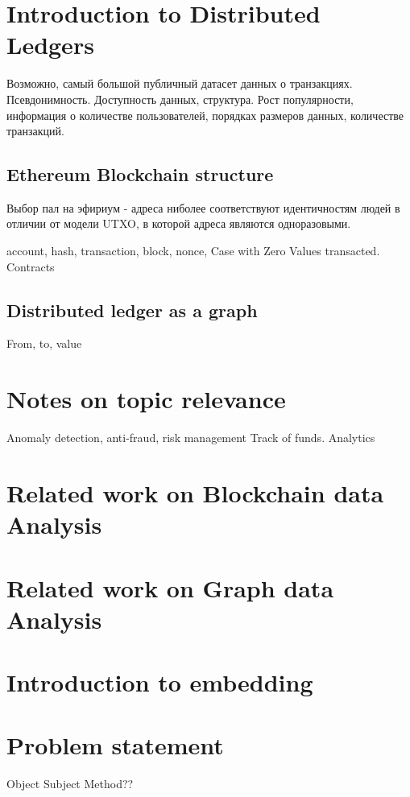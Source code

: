 \Introduction

\section{Introduction to Distributed Ledgers}
Возможно, самый большой публичный датасет данных о транзакциях. Псевдонимность. Доступность данных, структура.
Рост популярности, информация о количестве пользователей, порядках размеров данных, количестве транзакций. 

\subsection{Ethereum Blockchain structure}
Выбор пал на эфириум - адреса ниболее соответствуют идентичностям людей в отличии от модели UTXO, в которой адреса являются одноразовыми. 

account, hash, transaction, block, nonce, 
Case with Zero Values transacted. Contracts
\subsection{Distributed ledger as a graph}
From, to, value

\section{Notes on topic relevance}
Anomaly detection, anti-fraud, risk management
Track of funds. Analytics


\section{Related work on Blockchain data Analysis}

\section{Related work on Graph data Analysis}

\section{Introduction to embedding}

\section{Problem statement}
Object
Subject 
Method??